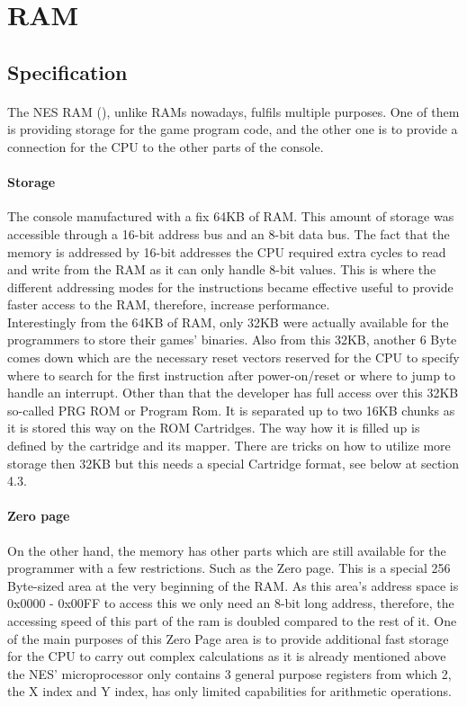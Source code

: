 \documentclass[]{report}
\begin{document}
\section{RAM}

\subsection{Specification}
\paragraph{ }
The NES RAM (\cite{NSRM}), unlike RAMs nowadays, fulfils multiple purposes. One of them is providing storage for the game program code, and the other one is to provide a connection for the CPU to the other parts of the console.
\paragraph{Storage}
The console manufactured with a fix 64KB of RAM. This amount of storage was accessible through a 16-bit address bus and an 8-bit data bus. The fact that the memory is addressed by 16-bit addresses the CPU required extra cycles to read and write from the RAM as it can only handle 8-bit values. This is where the different addressing modes for the instructions became effective useful to provide faster access to the RAM, therefore, increase performance.
\\
Interestingly from the 64KB of RAM, only 32KB were actually available for the programmers to store their games' binaries. Also from this 32KB, another 6 Byte comes down which are the necessary reset vectors reserved for the CPU to specify where to search for the first instruction after power-on/reset or where to jump to handle an interrupt. Other than that the developer has full access over this 32KB so-called PRG ROM or Program Rom. It is separated up to two 16KB chunks as it is stored this way on the ROM Cartridges. The way how it is filled up is defined by the cartridge and its mapper. There are tricks on how to utilize more storage then 32KB but this needs a special Cartridge format, see below at section 4.3. 

\paragraph{Zero page}
On the other hand, the memory has other parts which are still available for the programmer with a few restrictions. Such as the Zero page. This is a special 256 Byte-sized area at the very beginning of the RAM.
As this area's address space is 0x0000 - 0x00FF to access this we only need an 8-bit long address, therefore, the accessing speed of this part of the ram is doubled compared to the rest of it. One of the main purposes of this Zero Page area is to provide additional fast storage for the CPU to carry out complex calculations as it is already mentioned above the NES' microprocessor only contains 3 general purpose registers from which 2, the X index and Y index, has only limited capabilities for arithmetic operations.
 
\end{document}
